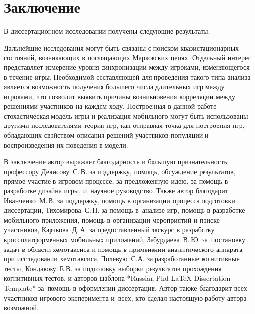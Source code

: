 \chapter*{Заключение}                       %


В диссертационном исследовании получены следующие результаты.


Дальнейшие исследования могут быть связаны с поиском квазистационарных состояний, возникающих в поглощающих Марковских цепях. Отдельный интерес представляет измерение уровня синхронизации между игроками, изменяющегося в течение игры. Необходимой составляющей для проведения такого типа анализа является возможность получения большего числа длительных игр между игроками, что позволит выявить причины возникновения корреляции между решениями участников на каждом ходу. Построенная в данной работе стохастическая модель игры и реализация мобильного могут быть использованы другими исследователями теории игр, как отправная точка для построения игр, обладающих свойством описания решений участников популяции и воспроизведения их поведения в модели. 

В заключение автор выражает благодарность и большую признательность профессору Денисову~С.\,В. за поддержку, помощь, обсуждение результатов, прямое участие в игровом процессе, за предложенную идею, за помощь в разработке дизайна игры, и~научное руководство. Также автор благодарит Иванченко~М.\,В. за поддержку, помощь в организации процесса подготовки диссертации, Тихомирова~С.\,Н. за помощь в~анализе игр, помощь в разработке мобильного приложения, помощь в организации мероприятий и поиске участников, Карчкова~Д.\,А. за предоставленный экскурс в разработку кроссплатформенных мобильных приложений, Забурдаева~В.\,Ю. за~постановку задач в области хемотаксиса и помощь в применении аналитического аппарата при исследовании хемотаксиса, Полевую~С.А. за разработанные когнитивные тесты, Кондакову~Е.В. за подготовку выборки результатов прохождения когнитивных тестов, и авторов шаблона *Russian-Phd-LaTeX-Dissertation-Template* за~помощь в оформлении диссертации. Автор также благодарит всех участников игрового эксперимента и~всех, кто сделал настоящую работу автора возможной.
